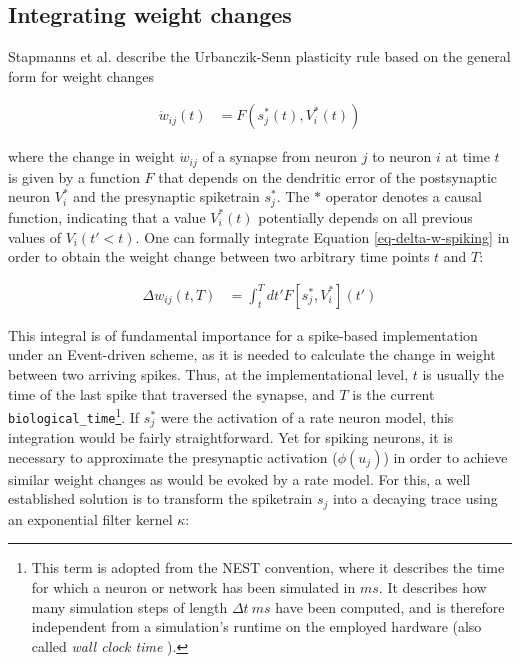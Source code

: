 \subsection{Integrating weight changes}


Stapmanns et al. describe the Urbanczik-Senn plasticity rule based on the general form for weight changes

\begin{align}
  \dot{w}_{ij}(t) & = F(s_j^\ast (t), V_i^\ast (t)) \label{eq-delta-w-spiking}
\end{align}

where the change in weight $\dot{w}_{ij}$ of a synapse from neuron $j$ to neuron $i$ at time $t$ is given by a function
$F$ that depends on the dendritic error of the postsynaptic neuron $V_i^\ast$ and the presynaptic spiketrain $s_j^\ast$.
The $\ast$ operator denotes a causal function, indicating that a value $V_i^\ast(t)$ potentially depends on all previous
values of $V_i(t' < t)$. One can formally integrate Equation \ref{eq-delta-w-spiking} in order to obtain the weight
change between two arbitrary time points $t$ and $T$:

\begin{align}
  \Delta w_{ij}(t,T) & = \int_t^T dt' F[s_j^\ast, V_i^\ast](t') \label{eq-delta-w-t-T}
\end{align}

This integral is of fundamental importance for a spike-based implementation under an Event-driven scheme, as it is
needed to calculate the change in weight between two arriving spikes. Thus, at the implementational level, $t$ is
usually the time of the last spike that traversed the synapse, and $T$ is the current
\texttt{biological\_time}\footnote{This term is adopted from the NEST convention, where it describes the time for which
  a neuron or network has been simulated in $ms$. It describes how many simulation steps of length $\Delta t \ ms$ have
  been computed, and is therefore independent from a simulation's runtime  on the employed hardware (also called
  \textit{wall clock time} \citep{albada2018performance}). }. If $s_j^\ast$ were the activation of a rate neuron model,
this integration would be fairly straightforward. Yet for spiking neurons, it is necessary to approximate the
presynaptic activation ($\phi(u_j)$) in order to achieve similar weight changes as would be evoked by a rate model. For
this, a well established solution is to transform the spiketrain $s_j$ into a decaying trace using an exponential filter
kernel $\kappa$:

